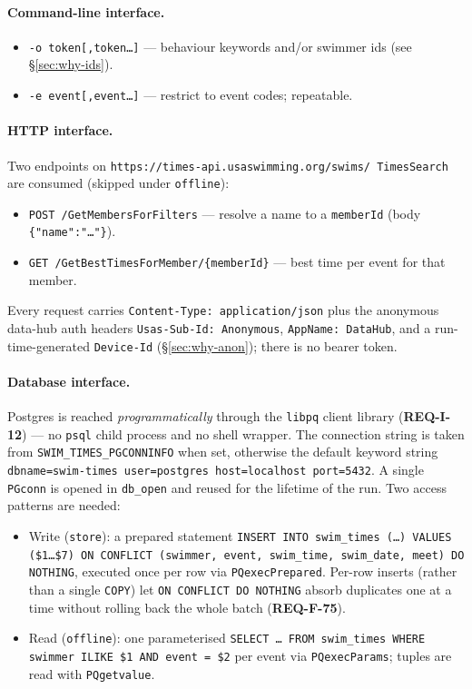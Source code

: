 \documentclass[12pt]{article}
\newcommand{\code}[1]{\texttt{#1}}
\newcommand{\req}[1]{\textbf{#1}}
\begin{document}
\begin{description}[style=nextline]
\paragraph{Command-line interface.}
\begin{itemize}
  \item \code{-o token[,token\ldots]} --- behaviour keywords and/or
        swimmer ids (see \S\ref{sec:why-ids}).
  \item \code{-e event[,event\ldots]} --- restrict to event codes;
        repeatable.
\end{itemize}

\paragraph{HTTP interface.}
Two endpoints on \code{https://times-api.usaswimming.org/swims/%
TimesSearch} are consumed (skipped under \code{offline}):
\begin{itemize}
  \item \code{POST /GetMembersForFilters} --- resolve a name to a
        \code{memberId} (body \code{\{"name":"\dots"\}}).
  \item \code{GET /GetBestTimesForMember/\{memberId\}} --- best time
        per event for that member.
\end{itemize}

Every request carries \code{Content-Type: application/json} plus the
anonymous data-hub auth headers \code{Usas-Sub-Id: Anonymous},
\code{AppName: DataHub}, and a run-time-generated \code{Device-Id}
(\S\ref{sec:why-anon}); there is no bearer token.

\paragraph{Database interface.}
Postgres is reached \emph{programmatically} through the
\texttt{libpq} client library (\req{REQ-I-12}) --- no
\texttt{psql} child process and no shell wrapper.  The
connection string is taken from
\texttt{SWIM\_TIMES\_PGCONNINFO} when set, otherwise the
default keyword string
\texttt{dbname=swim-times user=postgres host=localhost port=5432}.
A single \code{PGconn} is opened in \code{db\_open} and reused
for the lifetime of the run.  Two access patterns are needed:
\begin{itemize}
  \item Write (\code{store}): a prepared statement
        \texttt{INSERT INTO swim\_times (\dots) VALUES
        (\$1\dots\$7) ON CONFLICT (swimmer, event, swim\_time,
        swim\_date, meet) DO NOTHING}, executed once per row via
        \code{PQexecPrepared}.  Per-row inserts (rather than a
        single \texttt{COPY}) let \texttt{ON~CONFLICT~DO~NOTHING}
        absorb duplicates one at a time without rolling back the
        whole batch (\req{REQ-F-75}).
  \item Read (\code{offline}): one parameterised
        \texttt{SELECT \dots\ FROM swim\_times WHERE swimmer
        ILIKE \$1 AND event = \$2} per event via
        \code{PQexecParams}; tuples are read with
        \code{PQgetvalue}.
\end{itemize}


\end{description}
\end{document}
